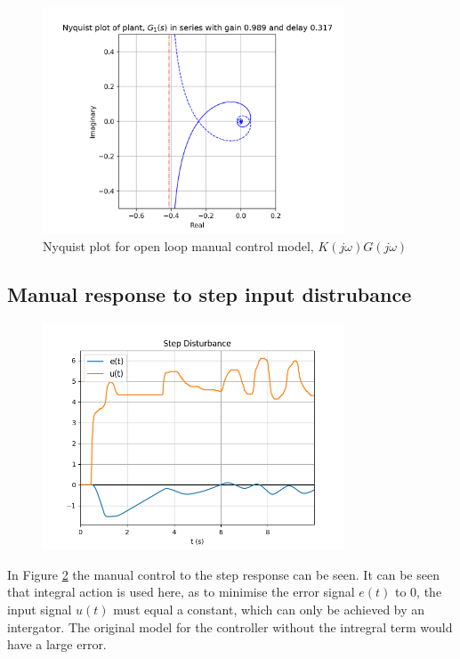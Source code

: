 \documentclass[8pt]{article}
\begin{document}
\begin{figure}[H]
    \centering
    \includegraphics[width=0.8\textwidth]{figures/nyquist1.png}
    \caption{Nyquist plot for open loop manual control model, $K(j\omega)G(j\omega)$}
    \label{fig:nyquist1}
\end{figure}

\subsection{Manual response to step input distrubance}

\begin{figure}[H]
    \centering
    \includegraphics[width=0.8\textwidth]{figures/FIGURE_3.png}
    \caption{}
    \label{fig:figure3}
\end{figure}

In Figure \ref{fig:figure3} the manual control to the step response can be seen. It can be seen that integral action is used here, as to minimise the error signal $e(t)$ to 0, the input signal $u(t)$ must equal a constant, which can only be achieved by an intergator.
The original model for the controller without the intregral term would have a large error.
\end{document}
